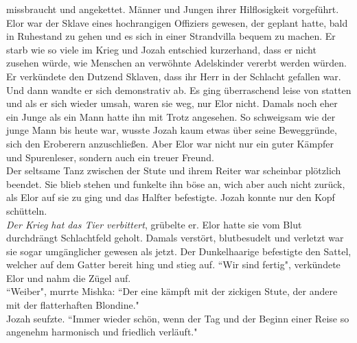 missbraucht und angekettet. Männer und Jungen ihrer Hilflosigkeit vorgeführt. Elor war 
der Sklave eines hochrangigen Offiziers gewesen, der geplant hatte, bald in Ruhestand zu gehen und 
es sich in einer Strandvilla bequem zu machen. Er starb wie so viele im Krieg und Jozah entschied 
kurzerhand, dass er nicht zusehen würde, wie Menschen an verwöhnte Adelskinder vererbt werden 
würden. Er verkündete den Dutzend Sklaven, dass ihr Herr in der Schlacht gefallen war. Und dann 
wandte er sich demonstrativ ab. Es ging überraschend leise von statten und als er sich wieder 
umsah, waren sie weg, nur Elor nicht. Damals noch eher ein Junge als ein Mann hatte ihn mit 
Trotz angesehen. So schweigsam wie der junge Mann bis heute war, wusste Jozah kaum etwas über seine 
Beweggründe, sich den Eroberern anzuschließen. Aber Elor war nicht nur ein guter Kämpfer und 
Spurenleser, sondern auch ein treuer Freund. \\
Der seltsame Tanz zwischen der Stute und ihrem Reiter war scheinbar plötzlich beendet. Sie blieb 
stehen und funkelte ihn böse an, wich aber auch nicht zurück, als Elor auf sie zu ging und das 
Halfter befestigte. Jozah konnte nur den Kopf schütteln. \\
\textit{Der Krieg hat das Tier verbittert}, grübelte er. Elor hatte sie vom Blut durchdrängt 
Schlachtfeld geholt. Damals verstört, blutbesudelt und verletzt war sie sogar umgänglicher gewesen 
als jetzt. Der Dunkelhaarige befestigte den Sattel, welcher auf dem Gatter bereit hing und stieg 
auf. ``Wir sind fertig", verkündete Elor und nahm die Zügel auf. \\
``Weiber", murrte Mishka: ``Der eine kämpft mit der zickigen Stute, der andere mit 
der flatterhaften Blondine."\\
Jozah seufzte. ``Immer wieder schön, wenn der Tag und der Beginn einer Reise so angenehm harmonisch 
und friedlich verläuft."\\

